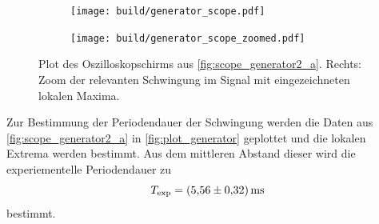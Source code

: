 \begin{figure}
  \begin{subfigure}[c]{0.49\textwidth}
    \centering
    \texttt{[image: build/generator\_scope.pdf]}
  \end{subfigure}
  \begin{subfigure}[c]{0.49\textwidth}
    \centering
    \texttt{[image: build/generator\_scope\_zoomed.pdf]}
  \end{subfigure}
  \caption{Plot des Oszilloskopschirms aus \autoref{fig:scope_generator2_a}. Rechts: Zoom der relevanten Schwingung im Signal mit eingezeichneten
  lokalen Maxima.}
  \label{fig:plot_generator}
\end{figure}
Zur Bestimmung der Periodendauer der Schwingung werden die Daten aus \autoref{fig:scope_generator2_a} in \autoref{fig:plot_generator} geplottet
und die lokalen Extrema werden bestimmt. Aus dem mittleren Abstand dieser wird die experiementelle Periodendauer zu
\begin{equation*}
  T_{\mathrm{exp}} = \qty{5.56+-0.32}{\milli\second}
\end{equation*}
bestimmt.